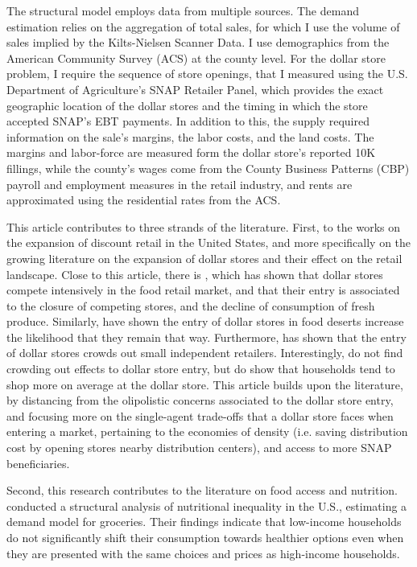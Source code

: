 \documentclass[11.5pt]{article}
\begin{document}
The structural model employs data from multiple sources. The demand estimation relies on the aggregation of total sales, for which I use the volume of sales implied by the Kilts-Nielsen Scanner Data. I use demographics from the American Community Survey (ACS) at the county level. For the dollar store problem, I require the sequence of store openings, that I measured using the U.S. Department of Agriculture's SNAP Retailer Panel, which provides the exact geographic location of the dollar stores and the timing in which the store accepted SNAP's EBT payments. In addition to this, the supply required information on the sale's margins, the labor costs, and the land costs. The margins and labor-force are measured form the dollar store's reported 10K fillings, while the county's wages come from the County Business Patterns (CBP) payroll and employment measures in the retail industry, and rents are approximated using the residential rates from the ACS. 

This article contributes to three strands of the literature. First, to the works on the expansion of discount retail in the United States, and more specifically on the growing literature on the expansion of dollar stores and their effect on the retail landscape. Close to this article, there is  \citeauthor{caoui2022impact} \citeyear{caoui2022impact}, which has shown that dollar stores compete intensively in the food retail market, and that their entry is associated to the closure of competing stores, and the decline of consumption of fresh produce. Similarly,  \citeauthor{chenarides2021dollar} \citeyear{chenarides2021dollar} have shown the entry of dollar stores in food deserts increase the likelihood that they remain that way. Furthermore, \citeauthor{chenarides2024dynamic} \citeyear{chenarides2024dynamic} has shown that the entry of dollar stores crowds out small independent retailers. Interestingly, \citeauthor{schneier2023buck} \citeyear{schneier2023buck} do not find crowding out effects to dollar store entry, but do show that households tend to shop more on average at the dollar store. This article builds upon the literature, by distancing from the olipolistic concerns associated to the dollar store entry, and focusing more on the single-agent trade-offs that a dollar store faces when entering a market, pertaining to the economies of density (i.e. saving distribution cost by opening stores nearby distribution centers), and access to more SNAP beneficiaries.

Second, this research contributes to the literature on food access and nutrition. \citeauthor{allcott2019food} \citeyear{allcott2019food} conducted a structural analysis of nutritional inequality in the U.S., estimating a demand model for groceries. Their findings indicate that low-income households do not significantly shift their consumption towards healthier options even when they are presented with the same choices and prices as high-income households. 
\end{document}
